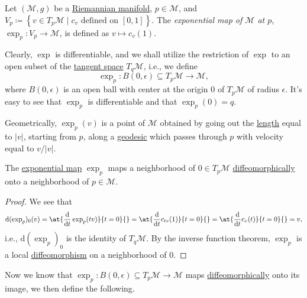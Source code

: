 \begin{definition}\label{def:exponential-map}
	Let \((\mathcal{M} , g)\) be a \hyperref[def:Riemannian-manifold]{Riemannian manifold}, \(p\in \mathcal{M} \), and \(V_p \coloneqq \left\{ v\in T_p \mathcal{M} \mid c_v \text{ defined on } [0, 1] \right\}\). The \emph{exponential map of \(\mathcal{M} \) at \(p\)}, \(\exp_p \colon V_p \to \mathcal{M} \), is defined as \(v \mapsto c_v(1)\).
\end{definition}

Clearly, \(\exp \) is differentiable, and we shall utilize the restriction of \(\exp \) to an open subset of the \hyperref[def:tangent-space]{tangent space} \(T_q \mathcal{M} \), i.e., we define
\[
	\exp _p\colon B(0, \epsilon ) \subseteq T_p \mathcal{M} \to \mathcal{M} ,
\]
where \(B(0, \epsilon ) \) is an open ball with center at the origin \(0\) of \(T_p \mathcal{M} \) of radius \(\epsilon \). It's easy to see that \(\exp _p\) is differentiable and that \(\exp _p(0) = q\).

\begin{intuition}
	Geometrically, \(\exp _p(v)\) is a point of \(\mathcal{M} \) obtained by going out the \hyperref[def:length]{length} equal to \(\vert v \vert \), starting from \(p\), along a \hyperref[def:geodesic]{geodesic} which passes through \(p\) with velocity equal to \(v / \vert v \vert \).
\end{intuition}

\begin{proposition}
	The \hyperref[def:exponential-map]{exponential map} \(\exp _p\) maps a neighborhood of \(0\in T_p \mathcal{M} \) \hyperref[def:diffeomorphic]{diffeomorphically} onto a neighborhood of \(p\in \mathcal{M} \).
\end{proposition}
\begin{proof}
	We see that
	\[
		\mathrm{d} (\exp _p)_0(v)
		= \at{\frac{\mathrm{d}}{\mathrm{d}t} \exp _p(tv)}{t=0}{}
		= \at{\frac{\mathrm{d}}{\mathrm{d}t} c_{tv}(1)}{t=0}{}
		= \at{\frac{\mathrm{d}}{\mathrm{d}t} c_{v}(t)}{t=0}{}
		= v,
	\]
	i.e., \(\mathrm{d} (\exp _p)_0\) is the identity of \(T_q \mathcal{M} \). By the inverse function theorem, \(\exp _p\) is a local \hyperref[def:diffeomorphism]{diffeomorphism} on a neighborhood of \(0\).
\end{proof}

Now we know that \(\exp _p\colon B(0, \epsilon ) \subseteq T_p \mathcal{M} \to  \mathcal{M} \) maps \hyperref[def:diffeomorphic]{diffeomorphically} onto its image, we then define the following.

